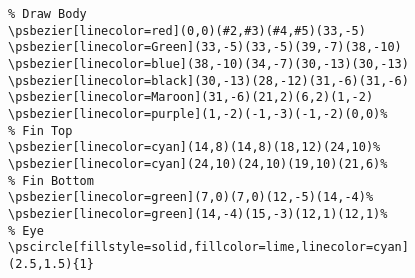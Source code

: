 \documentclass[11pt, a4paper]{article}
\begin{document}
\begin{figure}[!h]
\centering%
\begin{lstlisting}
% Draw Body
\psbezier[linecolor=red](0,0)(#2,#3)(#4,#5)(33,-5)
\psbezier[linecolor=Green](33,-5)(33,-5)(39,-7)(38,-10)
\psbezier[linecolor=blue](38,-10)(34,-7)(30,-13)(30,-13)
\psbezier[linecolor=black](30,-13)(28,-12)(31,-6)(31,-6)
\psbezier[linecolor=Maroon](31,-6)(21,2)(6,2)(1,-2)
\psbezier[linecolor=purple](1,-2)(-1,-3)(-1,-2)(0,0)%
% Fin Top
\psbezier[linecolor=cyan](14,8)(14,8)(18,12)(24,10)%
\psbezier[linecolor=cyan](24,10)(24,10)(19,10)(21,6)%
% Fin Bottom
\psbezier[linecolor=green](7,0)(7,0)(12,-5)(14,-4)%
\psbezier[linecolor=green](14,-4)(15,-3)(12,1)(12,1)%
% Eye
\pscircle[fillstyle=solid,fillcolor=lime,linecolor=cyan](2.5,1.5){1}
\end{lstlisting}
\end{figure}
\end{document}
